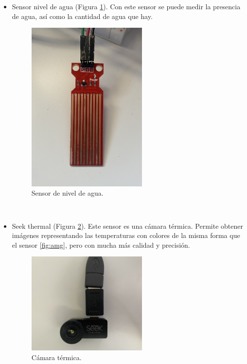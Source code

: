 \begin{itemize}
\item{Sensor nivel de agua (Figura \ref{fig:nivel}).} Con este sensor se puede medir la presencia de agua, así como la cantidad de agua que hay.
\begin{figure} [h!]
  \begin{center}
    \includegraphics[width=6cm]{figs/nivel}
  \end{center}
  \caption{Sensor de nivel de agua.}
  \label{fig:nivel}
\end{figure}\\


\item{Seek thermal (Figura \ref{fig:seek}).} Este sensor es una cámara térmica. Permite obtener imágenes representando las temperaturas con colores de la misma forma que el sensor \ref{fig:amg}, pero con mucha más calidad y precisión.\begin{figure} [h!]
  \begin{center}
    \includegraphics[width=6cm]{figs/seek}
  \end{center}
  \caption{Cámara térmica.}
  \label{fig:seek}
\end{figure}\\


\end{itemize}
